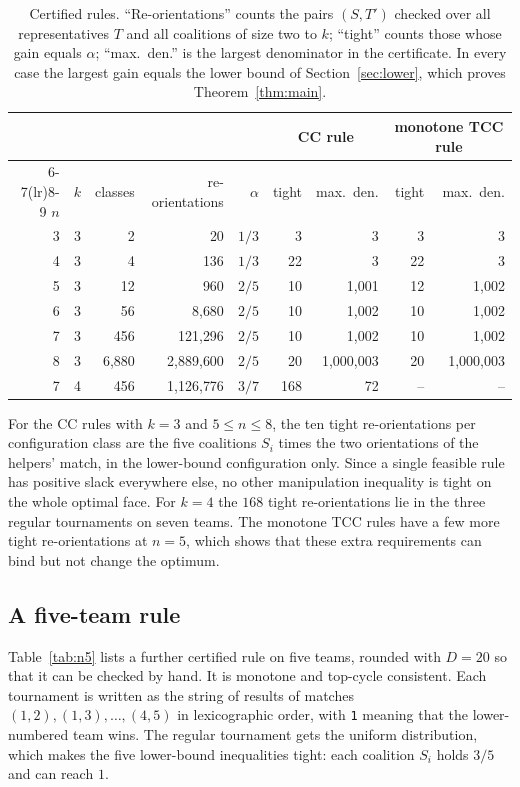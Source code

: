 \documentclass[11pt]{amsart}
\theoremstyle{definition}
\theoremstyle{remark}
\begin{document}
\begin{table}[ht]
\centering\small
\begin{tabular}{rrrrrrrrr}
\toprule
&&&&& \multicolumn{2}{c}{CC rule} & \multicolumn{2}{c}{monotone TCC rule}\\
\cmidrule(lr){6-7}\cmidrule(lr){8-9}
$n$ & $k$ & classes & re-orientations & $\alpha$ & tight & max.\ den. & tight & max.\ den.\\
\midrule
3 & 3 & 2 & 20 & $1/3$ & 3 & 3 & 3 & 3\\
4 & 3 & 4 & 136 & $1/3$ & 22 & 3 & 22 & 3\\
5 & 3 & 12 & 960 & $2/5$ & 10 & 1{,}001 & 12 & 1{,}002\\
6 & 3 & 56 & 8{,}680 & $2/5$ & 10 & 1{,}002 & 10 & 1{,}002\\
7 & 3 & 456 & 121{,}296 & $2/5$ & 10 & 1{,}002 & 10 & 1{,}002\\
8 & 3 & 6{,}880 & 2{,}889{,}600 & $2/5$ & 20 & 1{,}000{,}003 & 20 & 1{,}000{,}003\\
7 & 4 & 456 & 1{,}126{,}776 & $3/7$ & 168 & 72 & -- & --\\
\bottomrule
\end{tabular}
\caption{Certified rules. ``Re-orientations'' counts the pairs $(S,T')$ checked over all representatives $T$ and all coalitions of size two to $k$; ``tight'' counts those whose gain equals $\alpha$; ``max.\ den.'' is the largest denominator in the certificate. In every case the largest gain equals the lower bound of Section~\ref{sec:lower}, which proves Theorem~\ref{thm:main}.}
\label{tab:results}
\end{table}

For the CC rules with $k=3$ and $5\le n\le 8$, the ten tight re-orientations per configuration class are the five coalitions $S_i$ times the two orientations of the helpers' match, in the lower-bound configuration only. Since a single feasible rule has positive slack everywhere else, no other manipulation inequality is tight on the whole optimal face. For $k=4$ the $168$ tight re-orientations lie in the three regular tournaments on seven teams. The monotone TCC rules have a few more tight re-orientations at $n=5$, which shows that these extra requirements can bind but not change the optimum.

\subsection*{A five-team rule}
Table~\ref{tab:n5} lists a further certified rule on five teams, rounded with $D=20$ so that it can be checked by hand. It is monotone and top-cycle consistent. Each tournament is written as the string of results of matches $(1,2),(1,3),\dots,(4,5)$ in lexicographic order, with \texttt{1} meaning that the lower-numbered team wins. The regular tournament gets the uniform distribution, which makes the five lower-bound inequalities tight: each coalition $S_i$ holds $3/5$ and can reach $1$.
\end{document}
